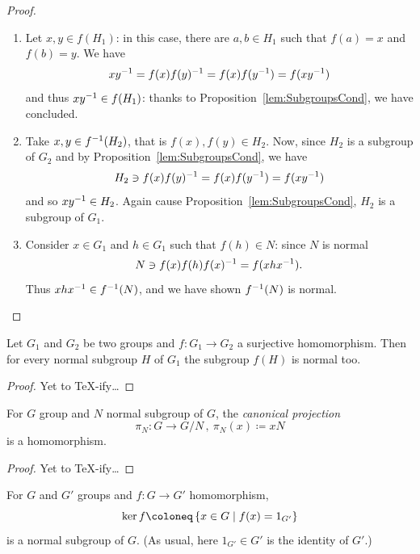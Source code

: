 \begin{proof}
\begin{enumerate}
\item Let \(x, y \in f(H_1)\): in this case, there are \(a, b \in H_1\) such that \(f(a) = x\) and \(f(b) = y\). We have
\[x y^{-1} = f(x) f(y)^{-1} = f(x) f(y^{-1}) = f(x y^{-1})\]
and thus \(x y^{-1} \in f(H_1)\): thanks to Proposition~\ref{lem:SubgroupsCond}, we have concluded.

\item Take \(x, y \in f^{-1}(H_2)\), that is \(f(x), f(y) \in H_2\). Now, since \(H_2\) is a subgroup of \(G_2\) and by Proposition~\ref{lem:SubgroupsCond}, we have
\[H_2 \owns f(x) f(y)^{-1} = f(x)f(y^{-1}) = f(x y^{-1})\]
and so \(x y^{-1} \in H_2\). Again cause Proposition~\ref{lem:SubgroupsCond}, \(H_2\) is a subgroup of \(G_1\).

\item Consider \(x \in G_1\) and \(h \in G_1\) such that \(f(h) \in N\): since \(N\) is normal
\[N \owns f(x) f(h) f(x)^{-1} = f(x h x^{-1}).\]
Thus \(x h x^{-1} \in f^{-1}(N)\), and we have shown \(f^{-1}(N)\) is normal.\qedhere
\end{enumerate}
\end{proof}

\begin{proposition}\label{prop:SurjectivityNormality}
Let \(G_1\) and \(G_2\) be two groups and \(f : G_1 \to G_2\) a surjective homomorphism. Then for every normal subgroup \(H\) of \(G_1\) the subgroup \(f(H)\) is normal too.
\end{proposition}

\begin{proof}
Yet to \TeX{}-ify\dots{}
\end{proof}

\begin{proposition}
For \(G\) group and \(N\) normal subgroup of \(G\), the {\em canonical projection}
\[\pi_N : G \to G/N\,, \ \pi_N(x) \coloneq xN\]
is a homomorphism.
\end{proposition}

\begin{proof}
Yet to \TeX{}-ify\dots{}
\end{proof}

\begin{proposition}
For \(G\) and \(G'\) groups and \(f : G \to G'\) homomorphism,
\[\ker f \coloneq \set{x \in G \mid f(x) = 1_{G'}}\]
is a normal subgroup of \(G\). (As usual, here \(1_{G'} \in G'\) is the identity of \(G'\).)
\end{proposition}

